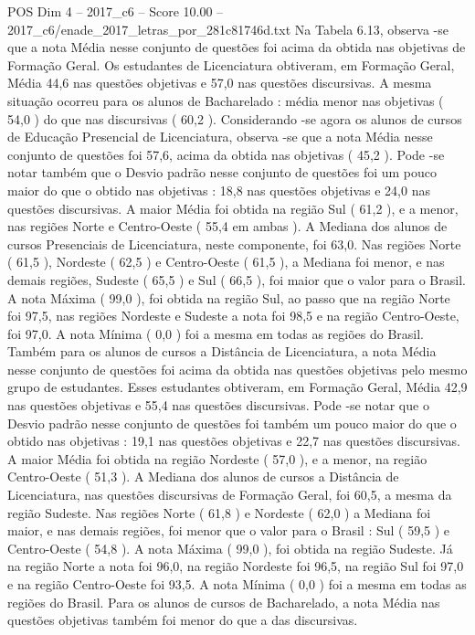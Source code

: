 \begin{textsample}{POS Dim 4 – 2017\_c6 – Score 10.00 – 2017\_c6/enade\_2017\_letras\_por\_281c81746d.txt}
Na Tabela 6.13, observa -se que a nota Média nesse conjunto de questões foi acima da obtida nas objetivas de Formação Geral.
Os estudantes de Licenciatura obtiveram, em Formação Geral, Média 44,6 nas questões objetivas e 57,0 nas questões discursivas.
A mesma situação ocorreu para os alunos de Bacharelado : média menor nas objetivas ( 54,0 ) do que nas discursivas ( 60,2 ).
Considerando -se agora os alunos de cursos de Educação Presencial de Licenciatura, observa -se que a nota Média nesse conjunto de questões foi 57,6, acima da obtida nas objetivas ( 45,2 ).
Pode -se notar também que o Desvio padrão nesse conjunto de questões foi um pouco maior do que o obtido nas objetivas : 18,8 nas questões objetivas e 24,0 nas questões discursivas.
A maior Média foi obtida na região Sul ( 61,2 ), e a menor, nas regiões Norte e Centro-Oeste ( 55,4 em ambas ).
A Mediana dos alunos de cursos Presenciais de Licenciatura, neste componente, foi 63,0.
Nas regiões Norte ( 61,5 ), Nordeste ( 62,5 ) e Centro-Oeste ( 61,5 ), a Mediana foi menor, e nas demais regiões, Sudeste ( 65,5 ) e Sul ( 66,5 ), foi maior que o valor para o Brasil.
A nota Máxima ( 99,0 ), foi obtida na região Sul, ao passo que na região Norte foi 97,5, nas regiões Nordeste e Sudeste a nota foi 98,5 e na região Centro-Oeste, foi 97,0.
A nota Mínima ( 0,0 ) foi a mesma em todas as regiões do Brasil.
Também para os alunos de cursos a Distância de Licenciatura, a nota Média nesse conjunto de questões foi acima da obtida nas questões objetivas pelo mesmo grupo de estudantes.
Esses estudantes obtiveram, em Formação Geral, Média 42,9 nas questões objetivas e 55,4 nas questões discursivas.
Pode -se notar que o Desvio padrão nesse conjunto de questões foi também um pouco maior do que o obtido nas objetivas : 19,1 nas questões objetivas e 22,7 nas questões discursivas.
A maior Média foi obtida na região Nordeste ( 57,0 ), e a menor, na região Centro-Oeste ( 51,3 ).
A Mediana dos alunos de cursos a Distância de Licenciatura, nas questões discursivas de Formação Geral, foi 60,5, a mesma da região Sudeste.
Nas regiões Norte ( 61,8 ) e Nordeste ( 62,0 ) a Mediana foi maior, e nas demais regiões, foi menor que o valor para o Brasil : Sul ( 59,5 ) e Centro-Oeste ( 54,8 ).
A nota Máxima ( 99,0 ), foi obtida na região Sudeste.
Já na região Norte a nota foi 96,0, na região Nordeste foi 96,5, na região Sul foi 97,0 e na região Centro-Oeste foi 93,5.
A nota Mínima ( 0,0 ) foi a mesma em todas as regiões do Brasil.
Para os alunos de cursos de Bacharelado, a nota Média nas questões objetivas também foi menor do que a das discursivas.

\end{textsample}

